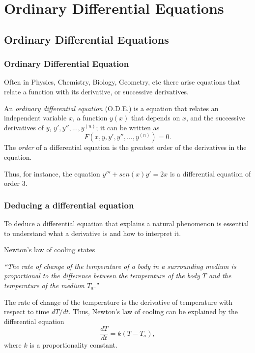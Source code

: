 
\section{Ordinary Differential Equations}



\subsection{Ordinary Differential Equations}
\begin{frame}
\frametitle{Ordinary Differential Equation}
Often in Physics, Chemistry, Biology, Geometry, etc there arise equations that relate a function with its derivative, or successive derivatives.

\begin{definition}
An \emph{ordinary differential equation} (O.D.E.) is a equation that relates an independent variable $x$, a function $y(x)$ that depends on $x$, and the successive derivatives of $y$, $y',y'',\ldots,y^{(n)}$; it can be written as
\[
F(x, y, y', y'',\ldots, y^{(n)})=0.
\] 
The \emph{order} of a differential equation is the greatest order of the derivatives in the equation. 
\end{definition}
Thus, for instance, the equation $y'''+sen(x)y'=2x$ is a differential equation of order 3.
\end{frame}


\begin{frame}
\frametitle{Deducing a differential equation}
To deduce a differential equation that explains a natural phenomenon is essential to understand what a derivative is and how to interpret it. 

 Newton's law of cooling states
\begin{center}
\begin{minipage}{0.8\textwidth}
\textit{``The rate of change of the temperature of a body in a surrounding medium is proportional to the difference between the temperature of the body $T$ and the temperature of the medium $T_a$.''}
\end{minipage}
\end{center}
The rate of change of the temperature is the derivative of temperature with respect to time $dT/dt$.
Thus, Newton's law of cooling can be explained by the differential equation
\[
\frac{dT}{dt}=k(T-T_a),
\]
where $k$ is a proportionality constant.
\end{frame}


